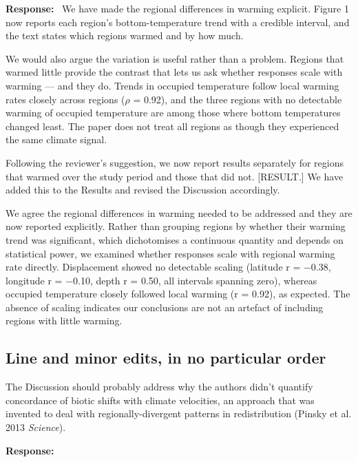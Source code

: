 \documentclass[11pt]{article}
\newcommand{\reviewer}[1]{\par\medskip\noindent\textcolor{revcolor}{#1}\par}
\newenvironment{reply}
{\par\smallskip\begingroup\color{replycolor}\noindent\textbf{Response:}\ }
{\endgroup\par\medskip}
\begin{document}
\begin{reply}
We have made the regional differences in warming explicit. Figure 1 now reports each region's bottom-temperature trend with a credible interval, and the text states which regions warmed and by how much.

We would also argue the variation is useful rather than a problem. Regions that warmed little provide the contrast that lets us ask whether responses scale with warming — and they do. Trends in occupied temperature follow local warming rates closely across regions ($\rho$ = 0.92), and the three regions with no detectable warming of occupied temperature are among those where bottom temperatures changed least. The paper does not treat all regions as though they experienced the same climate signal.

Following the reviewer's suggestion, we now report results separately for regions that warmed over the study period and those that did not. [RESULT.] We have added this to the Results and revised the Discussion accordingly.

We agree the regional differences in warming needed to be addressed and they are now reported explicitly. Rather than grouping regions by whether their warming trend was significant, which dichotomises a continuous quantity and depends on statistical power, we examined whether responses scale with regional warming rate directly. Displacement showed no detectable scaling (latitude r = −0.38, longitude r = −0.10, depth r = 0.50, all intervals spanning zero), whereas occupied temperature closely followed local warming (r = 0.92), as expected. The absence of scaling indicates our conclusions are not an artefact of including regions with little warming.
\end{reply}

\subsection*{Line and minor edits, in no particular order}

\reviewer{The Discussion should probably address why the authors didn't quantify
concordance of biotic shifts with climate velocities, an approach that was invented
to deal with regionally-divergent patterns in redistribution (Pinsky et al. 2013
\textit{Science}).}

\begin{reply}

\end{reply}
\end{document}
